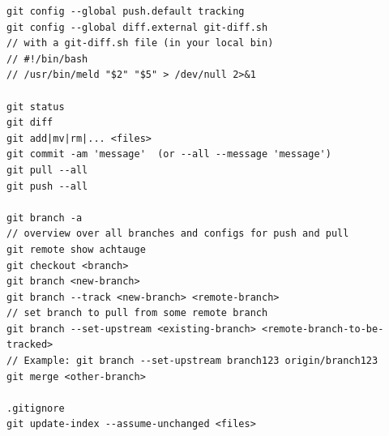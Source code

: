 \begin{code}
\begin{verbatim}
git config --global push.default tracking
git config --global diff.external git-diff.sh
// with a git-diff.sh file (in your local bin)
// #!/bin/bash
// /usr/bin/meld "$2" "$5" > /dev/null 2>&1

git status
git diff
git add|mv|rm|... <files>
git commit -am 'message'  (or --all --message 'message')
git pull --all
git push --all

git branch -a
// overview over all branches and configs for push and pull
git remote show achtauge
git checkout <branch>
git branch <new-branch>
git branch --track <new-branch> <remote-branch>
// set branch to pull from some remote branch
git branch --set-upstream <existing-branch> <remote-branch-to-be-tracked>
// Example: git branch --set-upstream branch123 origin/branch123
git merge <other-branch>

.gitignore
git update-index --assume-unchanged <files>
\end{verbatim}
\end{code}


